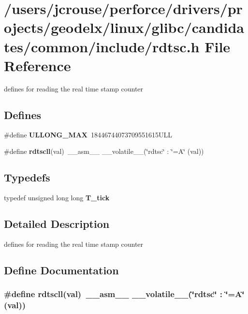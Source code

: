 \section{/users/jcrouse/perforce/drivers/projects/geodelx/linux/glibc/candidates/common/include/rdtsc.h File Reference}
\label{rdtsc_8h}
defines for reading the real time stamp counter 


\subsection*{Defines}
\begin{CompactItemize}
\item 
\#define {\bf ULLONG\_\-MAX}\ 18446744073709551615ULL
\item 
\#define {\bf rdtscll}(val)\ \_\-\_\-asm\_\-\_\- \_\-\_\-volatile\_\-\_\-(\char`\"{}rdtsc\char`\"{} : \char`\"{}=A\char`\"{} (val))
\end{CompactItemize}
\subsection*{Typedefs}
\begin{CompactItemize}
\item 
typedef unsigned long long {\bf T\_\-tick}
\end{CompactItemize}


\subsection{Detailed Description}
defines for reading the real time stamp counter





\subsection{Define Documentation}
\subsubsection{\setlength{\rightskip}{0pt plus 5cm}\#define rdtscll(val)\ \_\-\_\-asm\_\-\_\- \_\-\_\-volatile\_\-\_\-(\char`\"{}rdtsc\char`\"{} : \char`\"{}=A\char`\"{} (val))}\label{rdtsc_8h_a1}



